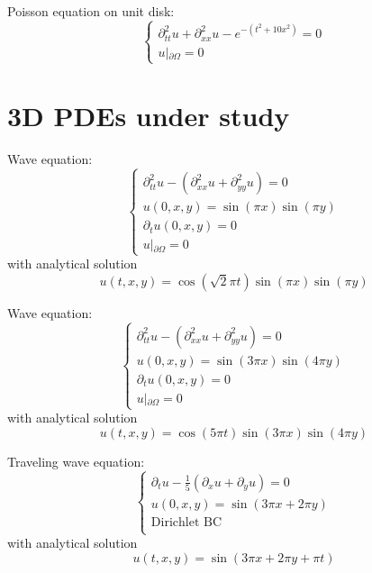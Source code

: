 \documentclass{article}
\begin{document}
\begin{enumerate}[label={[\arabic*]}]
\item{Poisson equation on unit disk:
\[\left\{ \begin{array}{llllllll}
\partial_{tt}^2 u + \partial_{xx}^2 u -e^{-(t^2+10x^2)}= 0\\
u\left|_{\partial\Omega}\right.=0
\end{array}
\right.\]\label{eq:Poisson2DDisk}}
\end{enumerate}



\section{3D PDEs under study}
\label{app:3D}
\begin{enumerate}[label={[\arabic*]}]
\item{Wave equation:
\[\left\{ \begin{array}{llllllll}
\partial_{tt}^2 u - (\partial_{xx}^2 u+ \partial_{yy}^2 u) = 0\\
u(0,x,y)=\sin(\pi x)\sin(\pi y)\\
\partial_t u(0,x,y)=0\\
u\left|_{\partial\Omega}\right.=0
\end{array}
\right.\]
with analytical solution
\[u(t,x,y)=\cos(\sqrt{2}\pi t)\sin(\pi x)\sin(\pi y)\]\label{eq:Wave3D}}

\item{Wave equation:
\[\left\{ \begin{array}{llllllll}
\partial_{tt}^2 u - (\partial_{xx}^2 u+ \partial_{yy}^2 u) = 0\\
u(0,x,y)=\sin(3 \pi x)\sin(4 \pi y)\\
\partial_t u(0,x,y)=0\\ 
u\left|_{\partial\Omega}\right.=0
\end{array}
\right.\]
with analytical solution
\[u(t,x,y)=\cos(5\pi t)\sin(3\pi x)\sin(4\pi y)\]\label{eq:Wave3D2}}

\item{Traveling wave equation: 
\[\left\{ \begin{array}{llllllll}
\partial_{t} u -\frac{1}{5}( \partial_{x} u +\partial_{y} u )= 0\\
u(0,x,y)=\sin(3\pi x+2\pi y)\\
\mbox{Dirichlet BC}\\
\end{array}
\right.\]
with analytical solution
\[u(t,x,y)=\sin(3\pi x+ 2\pi y + \pi t)\]\label{eq:Wave3DTravelling}}


\end{enumerate}
\end{document}
